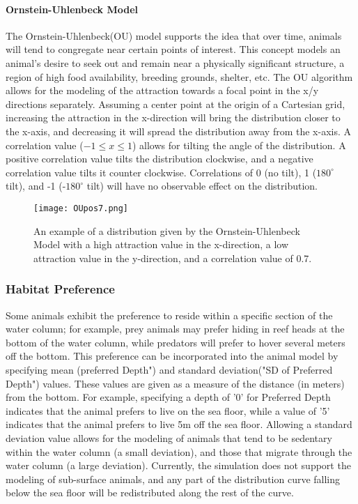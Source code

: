 \paragraph{Ornstein-Uhlenbeck Model}
\label{ouModel}
The Ornstein-Uhlenbeck(OU) model\cite{OU} supports the idea that over time, animals will tend to congregate near certain points of interest.  This concept models an animal's desire to seek out and remain near a physically significant structure, a region of high food availability, breeding grounds, shelter, etc.  The OU algorithm allows for the modeling of the attraction towards a focal point in the x/y directions separately.  Assuming a center point at the origin of a Cartesian grid, increasing the attraction in the x-direction will bring the distribution closer to the x-axis, and decreasing it will spread the distribution away from the x-axis.  A correlation value ($-1\le x \le 1$) allows for tilting the angle of the distribution.  A positive correlation value tilts the distribution clockwise, and a negative correlation value tilts it counter clockwise.  Correlations of 0 (no tilt), 1 ($180^{\circ}$ tilt), and -1 (-$180^{\circ}$ tilt) will have no observable effect on the distribution.
\begin{figure}[b]
	\label{OUimg}
	\centering
	\texttt{[image: OUpos7.png]}
	\caption{}\label{ouimg}
	\caption{An example of a distribution given by the Ornstein-Uhlenbeck Model with a high attraction value in the x-direction, a low attraction value in the y-direction, and a correlation value of 0.7.}
\end{figure}


\subsubsection{Habitat Preference}
\label{habitatPref}
Some animals exhibit the preference to reside within a specific section of the water column; for example, prey animals may prefer hiding in reef heads at the bottom of the water column, while predators will prefer to hover several meters off the bottom.  This preference can be incorporated into the animal model by specifying mean (preferred Depth") and standard deviation("SD of Preferred Depth") values.  These values are given as a measure of the distance (in meters) from the bottom.  For example, specifying a depth of '0' for Preferred Depth indicates that the animal prefers to live on the sea floor, while a value of '5' indicates that the animal prefers to live 5m off the sea floor.  Allowing a standard deviation value allows for the modeling of animals that tend to be sedentary within the water column (a small deviation), and those that migrate through the water column (a large deviation).  Currently, the simulation does not support the modeling of sub-surface animals, and any part of the distribution curve falling below the sea floor will be redistributed along the rest of the curve. 


